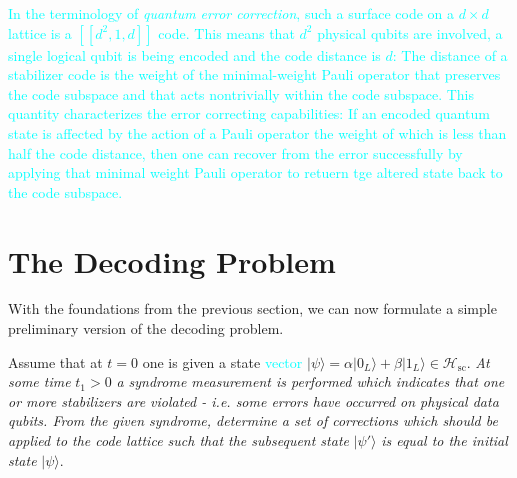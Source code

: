\documentclass[twocolumn,preprintnumbers,amsmath,amssymb,notitlepage,nofootinbib,longbibliography,superscriptaddress,aps,pra,10pt]{revtex4-1}
\newcommand{\je}[1]{\textcolor{cyan}{#1}}
\begin{document}
	 \je{In the terminology of \emph{quantum error correction}, such a surface code on a $d\times d$ lattice is a
	$[[d^2,1,d]]$ code. This means that $d^2$ physical qubits are involved, a single logical qubit is being encoded and the code distance is
	$d$: The distance of a stabilizer code is the weight of the minimal-weight Pauli operator that preserves the code subspace and that
	acts nontrivially within the code subspace. This quantity characterizes the error correcting capabilities: If an encoded
	quantum state is affected by the action of a Pauli operator the weight of which is less than half the code distance,
	then one can recover from the error successfully by applying that minimal weight Pauli operator to retuern tge
	altered state back to the code subspace.}


\section{The Decoding Problem}\label{s:the_decoding_problem}

	With the foundations from the previous section, we can now formulate a simple preliminary version of the decoding problem.

	\begin{problem}[\je{Decoding problem}]Assume that at $t=0$ one is given a state \je{vector} $|\psi\rangle = \alpha |0_L\rangle + \beta |1_L\rangle \in \mathcal{H}_{\mathrm{sc}}.$ \textit{At some time }$t_1>0$ \textit{a syndrome measurement is performed which indicates that one or more stabilizers are violated - i.e. some errors have occurred on physical data qubits. From the given syndrome, determine a set of corrections which should be applied to the code lattice such that the subsequent state} $|\psi'\rangle$ \textit{is equal to the initial state} $|\psi\rangle.$
	\end{problem}
\end{document}
